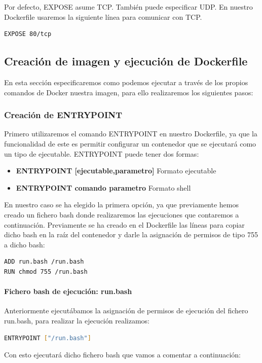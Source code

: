 Por defecto, EXPOSE asume TCP. También puede especificar UDP. En nuestro Dockerfile usaremos la siguiente línea para comunicar con TCP.

\begin{lstlisting}[language=bash]
EXPOSE 80/tcp
\end{lstlisting}
\subsection{Creación de imagen y ejecución de Dockerfile}
En esta sección especificaremos como podemos ejecutar a través de los propios comandos de Docker nuestra imagen, para ello realizaremos los siguientes pasos:
\subsubsection{Creación de ENTRYPOINT}
Primero utilizaremos el comando ENTRYPOINT en nuestro Dockerfile, ya que la funcionalidad de este es permitir configurar un contenedor que se ejecutará como un tipo de ejecutable. ENTRYPOINT puede tener dos formas:
\begin{itemize}
	\item \textbf{ENTRYPOINT [ejecutable,parametro]} Formato ejecutable
	\item \textbf{ENTRYPOINT comando parametro} Formato shell
\end{itemize}	
En nuestro caso se ha elegido la primera opción, ya que previamente hemos creado un fichero bash donde realizaremos las ejecuciones que contaremos a continuación. Previamente se ha creado en el Dockerfile las líneas para copiar dicho bash en la raíz del contenedor y darle la asignación de permisos de tipo 755 a dicho bash:
\begin{lstlisting}[language=bash]
ADD run.bash /run.bash
RUN chmod 755 /run.bash
\end{lstlisting}
\newpage
\paragraph{Fichero bash de ejecución: run.bash}

Anteriormente ejecutábamos la asignación de permisos de ejecución del fichero run.bash, para realizar la ejecución realizamos:
\begin{lstlisting}[language=bash]
ENTRYPOINT ["/run.bash"]
\end{lstlisting}

Con esto ejecutará dicho fichero bash que vamos a comentar a continuación:

